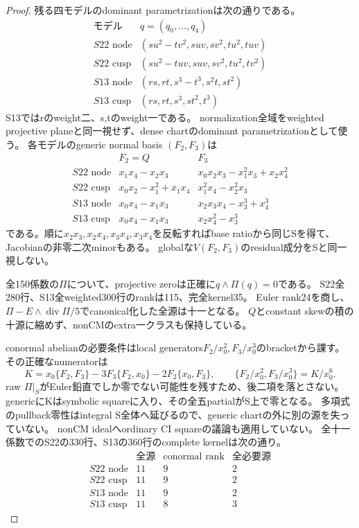 \documentclass[a4paper,11pt]{ltjsarticle}
\theoremstyle{definition}
\begin{document}
\begin{proof}
残る四モデルのdominant parametrizationは次の通りである。
\[
\begin{array}{c|l}
 \text{モデル}&q=(q_0,\ldots,q_4)\\\hline
 S22\text{ node}&(su^2-tv^2,suv,sv^2,tu^2,tuv)\\
 S22\text{ cusp}&(su^2-tuv,suv,sv^2,tu^2,tv^2)\\
 S13\text{ node}&(rs,rt,s^3-t^3,s^2t,st^2)\\
 S13\text{ cusp}&(rs,rt,s^3,st^2,t^3)
\end{array}
\]
S13ではrのweight二、s,tのweight一である。
normalization全域をweighted projective planeと同一視せず、dense chartのdominant parametrizationとして使う。
各モデルのgeneric normal basis $(F_2,F_3)$は
\[
\begin{array}{c|c|l}
 &F_2=Q&F_3\\\hline
 S22\text{ node}&x_1x_4-x_2x_3&x_0x_2x_3-x_1^2x_3+x_2x_4^2\\
 S22\text{ cusp}&x_0x_2-x_1^2+x_1x_4&x_1^2x_4-x_2^2x_3\\
 S13\text{ node}&x_0x_4-x_1x_3&x_2x_3x_4-x_3^3+x_4^3\\
 S13\text{ cusp}&x_0x_4-x_1x_3&x_2x_4^2-x_3^3
\end{array}
\]
である。順に$x_2x_3,x_2x_4,x_3x_4,x_3x_4$を反転すればbase ratioから同じSを得て、Jacobianの非零二次minorもある。
globalな$V(F_2,F_3)$のresidual成分をSと同一視しない。

全150係数の$\Pi$について、projective zeroは正確に$q\wedge\Pi(q)=0$である。
S22全280行、S13全weighted300行のrankは115、完全kernel35。
Euler rank24を商し、$\Pi-E\wedge\operatorname{div}\Pi/5$でcanonical化した全源は十一となる。
$Q$とconstant skewの積の十源に縮めず、nonCMのextra一クラスも保持している。

conormal abelianの必要条件はlocal generators$F_2/x_0^2,F_3/x_0^3$のbracketから課す。
その正確なnumeratorは
\[
 K=x_0\{F_2,F_3\}-3F_3\{F_2,x_0\}-2F_2\{x_0,F_3\},
 \qquad\{F_2/x_0^2,F_3/x_0^3\}=K/x_0^6.
\]
raw $\Pi|_S$がEuler鉛直でしか零でない可能性を残すため、後二項を落とさない。
genericにKはsymbolic squareに入り、その全五partialがS上で零となる。
多項式のpullback零性はintegral S全体へ延びるので、generic chartの外に別の源を失っていない。
nonCM idealへordinary CI squareの議論も適用していない。
全十一係数でのS22の330行、S13の360行のcomplete kernelは次の通り。
\[
\begin{array}{c|r|r|r}
 &\text{全源}&\text{conormal rank}&\text{全必要源}\\\hline
 S22\text{ node}&11&9&2\\S22\text{ cusp}&11&9&2\\
 S13\text{ node}&11&9&2\\S13\text{ cusp}&11&8&3
\end{array}
\]


\end{proof}
\end{document}
